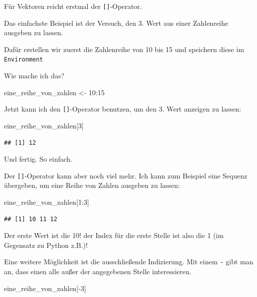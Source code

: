 \documentclass[
]{book}
\newenvironment{Shaded}{\begin{snugshade}}{\end{snugshade}}
\newcommand{\DecValTok}[1]{\textcolor[rgb]{0.00,0.00,0.81}{#1}}
\newcommand{\NormalTok}[1]{#1}
\newcommand{\OtherTok}[1]{\textcolor[rgb]{0.56,0.35,0.01}{#1}}
\newcommand{\SpecialCharTok}[1]{\textcolor[rgb]{0.00,0.00,0.00}{#1}}
\begin{document}
Für Vektoren reicht erstmal der \texttt{{[}{]}}-Operator.

Das einfachste Beispiel ist der Versuch, den 3. Wert aus einer Zahlenreihe ausgeben zu lassen.

Dafür erstellen wir zuerst die Zahlenreihe von 10 bis 15 und speichern diese im \texttt{Environment}

Wie mache ich das?

\begin{Shaded}
\begin{Highlighting}[]
\NormalTok{eine\_reihe\_von\_zahlen }\OtherTok{\textless{}{-}} \DecValTok{10}\SpecialCharTok{:}\DecValTok{15}
\end{Highlighting}
\end{Shaded}

Jetzt kann ich den \texttt{{[}{]}}-Operator benutzen, um den 3. Wert anzeigen zu lassen:

\begin{Shaded}
\begin{Highlighting}[]
\NormalTok{eine\_reihe\_von\_zahlen[}\DecValTok{3}\NormalTok{]}
\end{Highlighting}
\end{Shaded}

\begin{verbatim}
## [1] 12
\end{verbatim}

Und fertig. So einfach.

Der \texttt{{[}{]}}-Operator kann aber noch viel mehr. Ich kann zum Beispiel eine Sequenz übergeben, um eine Reihe von Zahlen ausgeben zu lassen:

\begin{Shaded}
\begin{Highlighting}[]
\NormalTok{eine\_reihe\_von\_zahlen[}\DecValTok{1}\SpecialCharTok{:}\DecValTok{3}\NormalTok{]}
\end{Highlighting}
\end{Shaded}

\begin{verbatim}
## [1] 10 11 12
\end{verbatim}

Der erste Wert ist die 10! der Index für die erste Stelle ist also die 1 (im Gegensatz zu Python z.B.)!

Eine weitere Möglichkeit ist die ausschließende Indizierung. Mit einem \texttt{-} gibt man an, dass einen alle außer der angegebenen Stelle interessieren.

\begin{Shaded}
\begin{Highlighting}[]
\NormalTok{eine\_reihe\_von\_zahlen[}\SpecialCharTok{{-}}\DecValTok{3}\NormalTok{]}
\end{Highlighting}
\end{Shaded}
\end{document}
